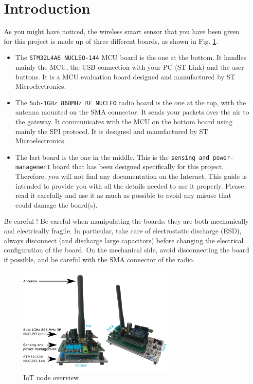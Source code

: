 \section*{Introduction}

As you might have noticed, the wireless smart sensor that you have been given for this project is made up of three different boards, as shown in Fig. \ref{fig:stack-overview}.

\begin{itemize}
    \item The \texttt{STM32L4A6 NUCLEO-144} MCU board is the one at the bottom. It handles mainly the MCU, the USB connection with your PC (ST-Link) and the user buttons. It is a MCU evaluation board designed and manufactured by ST Microelectronics.
    \item The \texttt{Sub-1GHz 868MHz RF NUCLEO} radio board is the one at the top, with the antenna mounted on the SMA connector. It sends your packets over the air to the gateway. It communicates with the MCU on the bottom board using mainly the SPI protocol. It is designed and manufactured by ST Microelectronics.
    \item The last board is the one in the middle. This is the \texttt{sensing and power-management} board that has been designed specifically for this project. Therefore, you will not find any documentation on the Internet. This guide is intended to provide you with all the details needed to use it properly. Please read it carefully and use it as much as possible to avoid any misuse that could damage the board(s).
\end{itemize}

\begin{bclogo}[couleur = gray!20, arrondi = 0.2, logo=\bcattention]{Be careful !}
Be careful when manipulating the boards: they are both mechanically and electrically fragile. In particular, take care of electrostatic discharge (ESD), always disconnect (and discharge large capacitors) before changing the electrical configuration of the board.
On the mechanical side, avoid disconnecting the board if possible, and be careful with the SMA connector of the radio.
\end{bclogo}


\begin{figure}[h!]
    \centering
    \includegraphics[width=0.7\textwidth]{figs/stack-overview.png}
    \caption{IoT node overview}
    \label{fig:stack-overview}
\end{figure}
